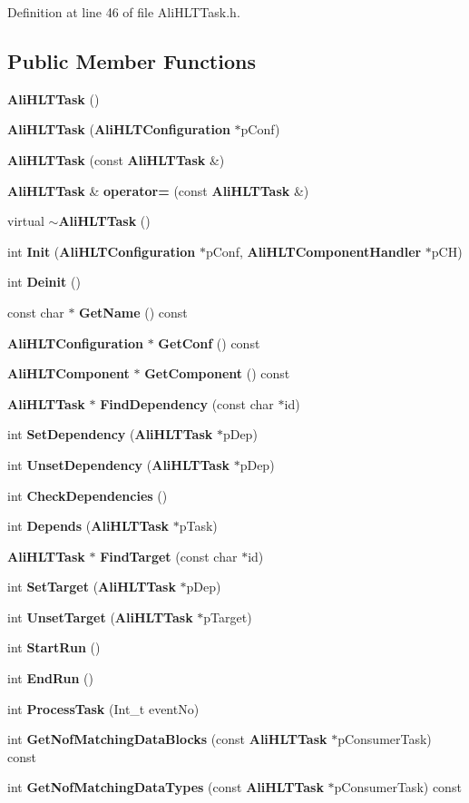 Definition at line 46 of file Ali\-HLTTask.h.\subsection*{Public Member Functions}
\begin{CompactItemize}
\item 
{\bf Ali\-HLTTask} ()
\item 
{\bf Ali\-HLTTask} ({\bf Ali\-HLTConfiguration} $\ast$p\-Conf)
\item 
{\bf Ali\-HLTTask} (const {\bf Ali\-HLTTask} \&)
\item 
{\bf Ali\-HLTTask} \& {\bf operator=} (const {\bf Ali\-HLTTask} \&)
\item 
virtual {\bf $\sim$Ali\-HLTTask} ()
\item 
int {\bf Init} ({\bf Ali\-HLTConfiguration} $\ast$p\-Conf, {\bf Ali\-HLTComponent\-Handler} $\ast$p\-CH)
\item 
int {\bf Deinit} ()
\item 
const char $\ast$ {\bf Get\-Name} () const 
\item 
{\bf Ali\-HLTConfiguration} $\ast$ {\bf Get\-Conf} () const 
\item 
{\bf Ali\-HLTComponent} $\ast$ {\bf Get\-Component} () const 
\item 
{\bf Ali\-HLTTask} $\ast$ {\bf Find\-Dependency} (const char $\ast$id)
\item 
int {\bf Set\-Dependency} ({\bf Ali\-HLTTask} $\ast$p\-Dep)
\item 
int {\bf Unset\-Dependency} ({\bf Ali\-HLTTask} $\ast$p\-Dep)
\item 
int {\bf Check\-Dependencies} ()
\item 
int {\bf Depends} ({\bf Ali\-HLTTask} $\ast$p\-Task)
\item 
{\bf Ali\-HLTTask} $\ast$ {\bf Find\-Target} (const char $\ast$id)
\item 
int {\bf Set\-Target} ({\bf Ali\-HLTTask} $\ast$p\-Dep)
\item 
int {\bf Unset\-Target} ({\bf Ali\-HLTTask} $\ast$p\-Target)
\item 
int {\bf Start\-Run} ()
\item 
int {\bf End\-Run} ()
\item 
int {\bf Process\-Task} (Int\_\-t event\-No)
\item 
int {\bf Get\-Nof\-Matching\-Data\-Blocks} (const {\bf Ali\-HLTTask} $\ast$p\-Consumer\-Task) const 
\item 
int {\bf Get\-Nof\-Matching\-Data\-Types} (const {\bf Ali\-HLTTask} $\ast$p\-Consumer\-Task) const 

\end{CompactItemize}
